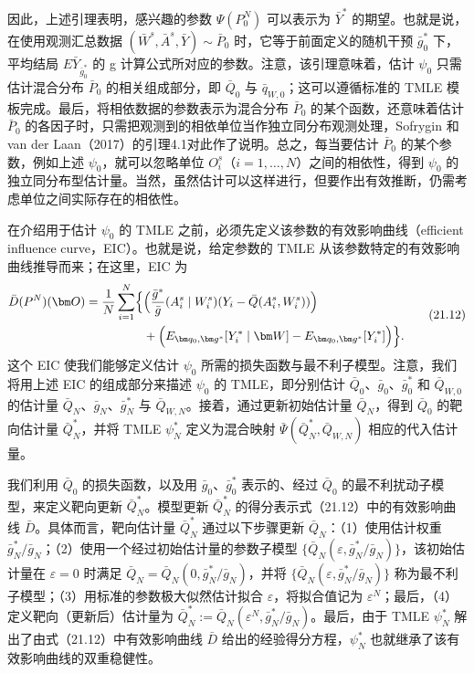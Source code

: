 因此，上述引理表明，感兴趣的参数 $\Psi(P_0^N)$ 可以表示为 $\bar Y^*$ 的期望。也就是说，在使用观测汇总数据 $(\bar W^s,\bar A^s,\bar Y)\sim\bar P_0$ 时，它等于前面定义的随机干预 $\bar g_0^*$ 下，平均结局 $E\bar Y_{\bar g_0^*}$ 的 g 计算公式所对应的参数。注意，该引理意味着，估计 $\psi_0$ 只需估计混合分布 $\bar P_0$ 的相关组成部分，即 $\bar Q_0$ 与 $\bar q_{W,0}$；这可以遵循标准的 TMLE 模板完成。最后，将相依数据的参数表示为混合分布 $\bar P_0$ 的某个函数，还意味着估计 $\bar P_0$ 的各因子时，只需把观测到的相依单位当作独立同分布观测处理，Sofrygin 和 van der Laan（2017）的引理4.1对此作了说明。总之，每当要估计 $\bar P_0$ 的某个参数，例如上述 $\psi_0$，就可以忽略单位 $O_i^s$（$i=1,\ldots,N$）之间的相依性，得到 $\psi_0$ 的独立同分布型估计量。当然，虽然估计可以这样进行，但要作出有效推断，仍需考虑单位之间实际存在的相依性。

在介绍用于估计 $\psi_0$ 的 TMLE 之前，必须先定义该参数的有效影响曲线（efficient influence curve，EIC）。也就是说，给定参数的 TMLE 从该参数特定的有效影响曲线推导而来；在这里，EIC 为
\begin{equation}
 \begin{aligned}
 \bar D(P^N)(\bm O)
 =\frac{1}{N}\sum_{i=1}^N\Bigl\{&
 \Bigl(\frac{\bar g^*}{\bar g}(A_i^s\mid W_i^s)
       (Y_i-\bar Q(A_i^s,W_i^s))\Bigr)\\
 &+\Bigl(E_{\bm q_0,\bm g^*}[Y_i^*\mid\bm W]
       -E_{\bm q_0,\bm g^*}[Y_i^*]\Bigr)\Bigr\}.
 \end{aligned}
 \tag{21.12}
\end{equation}
这个 EIC 使我们能够定义估计 $\psi_0$ 所需的损失函数与最不利子模型。注意，我们将用上述 EIC 的组成部分来描述 $\psi_0$ 的 TMLE，即分别估计 $\bar Q_0$、$\bar g_0$、$\bar g_0^*$ 和 $\bar Q_{W,0}$ 的估计量 $\bar Q_N$、$\bar g_N$、$\bar g_N^*$ 与 $\bar Q_{W,N}$。接着，通过更新初始估计量 $\bar Q_N$，得到 $\bar Q_0$ 的靶向估计量 $\bar Q_N^*$，并将 TMLE $\psi_N^*$ 定义为混合映射 $\bar\Psi(\bar Q_N^*,\bar Q_{W,N})$ 相应的代入估计量。

我们利用 $\bar Q_0$ 的损失函数，以及用 $\bar g_0$、$\bar g_0^*$ 表示的、经过 $\bar Q_0$ 的最不利扰动子模型，来定义靶向更新 $\bar Q_N^*$。模型更新 $\bar Q_N^*$ 的得分表示式（21.12）中的有效影响曲线 $\bar D$。具体而言，靶向估计量 $\bar Q_N^*$ 通过以下步骤更新 $\bar Q_N$：（1）使用估计权重 $\bar g_N^*/\bar g_N$；（2）使用一个经过初始估计量的参数子模型 $\{\bar Q_N(\varepsilon,\bar g_N^*/\bar g_N)\}$，该初始估计量在 $\varepsilon=0$ 时满足 $\bar Q_N=\bar Q_N(0,\bar g_N^*/\bar g_N)$，并将 $\{\bar Q_N(\varepsilon,\bar g_N^*/\bar g_N)\}$ 称为最不利子模型；（3）用标准的参数极大似然估计拟合 $\varepsilon$，将拟合值记为 $\varepsilon^N$；最后，（4）定义靶向（更新后）估计量为 $\bar Q_N^*:=\bar Q_N(\varepsilon^N,\bar g_N^*/\bar g_N)$。最后，由于 TMLE $\psi_N^*$ 解出了由式（21.12）中有效影响曲线 $\bar D$ 给出的经验得分方程，$\psi_N^*$ 也就继承了该有效影响曲线的双重稳健性。
